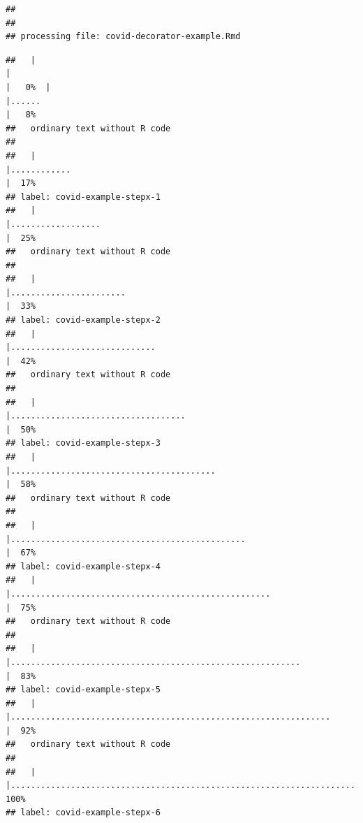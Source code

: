 \documentclass[
]{article}
\begin{document}
\begin{verbatim}
## 
## 
## processing file: covid-decorator-example.Rmd
\end{verbatim}

\begin{verbatim}
##   |                                                                              |                                                                      |   0%  |                                                                              |......                                                                |   8%
##   ordinary text without R code
## 
##   |                                                                              |............                                                          |  17%
## label: covid-example-stepx-1
##   |                                                                              |..................                                                    |  25%
##   ordinary text without R code
## 
##   |                                                                              |.......................                                               |  33%
## label: covid-example-stepx-2
##   |                                                                              |.............................                                         |  42%
##   ordinary text without R code
## 
##   |                                                                              |...................................                                   |  50%
## label: covid-example-stepx-3
##   |                                                                              |.........................................                             |  58%
##   ordinary text without R code
## 
##   |                                                                              |...............................................                       |  67%
## label: covid-example-stepx-4
##   |                                                                              |....................................................                  |  75%
##   ordinary text without R code
## 
##   |                                                                              |..........................................................            |  83%
## label: covid-example-stepx-5
##   |                                                                              |................................................................      |  92%
##   ordinary text without R code
## 
##   |                                                                              |......................................................................| 100%
## label: covid-example-stepx-6
\end{verbatim}
\end{document}
